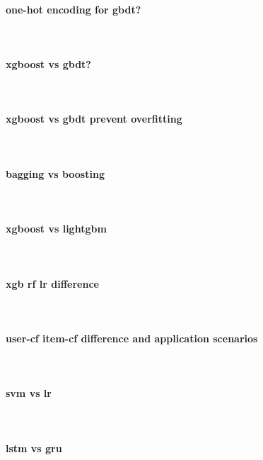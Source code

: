 \documentclass{article}
\begin{document}
\paragraph{one-hot encoding for gbdt?}~{}
\paragraph{xgboost vs gbdt?}~{}
\paragraph{xgboost vs gbdt prevent overfitting}~{}
\paragraph{bagging vs boosting}~{}
\paragraph{xgboost vs lightgbm}~{}
\paragraph{xgb rf lr difference}~{}
\paragraph{user-cf item-cf difference and application scenarios}~{}
\paragraph{svm vs lr}~{}
\paragraph{lstm vs gru}~{}
\end{document}
